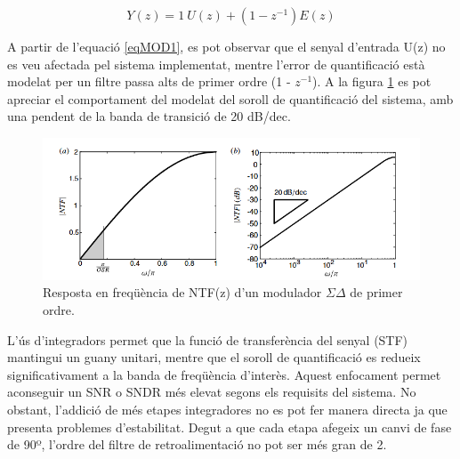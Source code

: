 \begin{equation}\label{eqMOD1}
    Y(z) = 1 \ U(z) + (1 - z^{-1})E(z)
\end{equation}
\par A partir de l'equació \ref{eqMOD1}, es pot observar que el senyal d'entrada U(z) no es veu afectada pel sistema implementat, mentre l'error de quantificació està modelat per un filtre passa alts de primer ordre (1 - $z^{-1}$). A la figura \ref{fig_NTFpendent} es pot apreciar el comportament del modelat del soroll de quantificació del sistema, amb una pendent de la banda de transició de 20 dB/dec. 
\begin{figure}[H]
    \centering
    \includegraphics[width=0.6\linewidth]{Images/graficaNTFMOD1.png}
    \caption{Resposta en freqüència de NTF(z) d'un modulador $\Sigma \Delta$ de primer ordre. \cite{UndrstndSDM}}
    \label{fig_NTFpendent}
\end{figure}

\par L'ús d'integradors permet que la funció de transferència del senyal (STF) mantingui un guany unitari, mentre que el soroll de quantificació es redueix significativament a la banda de freqüència d'interès. Aquest enfocament permet aconseguir un SNR o SNDR més elevat segons els requisits del sistema. No obstant, l'addició de més etapes integradores no es pot fer manera directa ja que presenta problemes d'estabilitat. Degut a que cada etapa afegeix un canvi de fase de 90º, l'ordre del filtre de retroalimentació no pot ser més gran de 2. 

